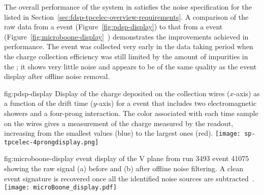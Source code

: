The overall performance of the  system in 
 satisfies the 
 noise specification %
for the  %
listed in Section~\ref{sec:fdsp-tpcelec-overview-requirements}. 
%
A comparison of the raw data from 
a  event (Figure~\ref{fig:pdsp-display}) to 
that from a  event (Figure~\ref{fig:microboone-display}~\cite{Acciarri:2017sde}) demonstrates the improvements achieved in  performance. 
The  event was collected very early in the data taking
period when the charge collection efficiency was still limited
by the amount of impurities in the ; it shows very little
noise and appears to be of the same quality as the 
event display after offline noise removal. 


\begin{dunefigure}
{fig:pdsp-display}
{Display of the charge deposited on the collection wires ($x$-axis) as
a function of the drift time ($y$-axis) for a  event 
that includes two electromagnetic showers and a four-prong interaction.
The color associated with each time sample on the 
wires gives a measurement of the charge measured by the 
readout, increasing from the smallest values (blue) to the largest
ones (red).}
\texttt{[image: sp-tpcelec-4prongdisplay.png]}
\end{dunefigure}

\begin{dunefigure}
{fig:microboone-display}
{ \twod event display of the V plane from run 3493 
event 41075 showing the raw signal (a) before and (b) after offline 
noise filtering. A clean event signature is recovered once all the 
identified noise sources are subtracted~\cite{Acciarri:2017sde}.}
\texttt{[image: microBoone\_display.pdf]}
\end{dunefigure}

